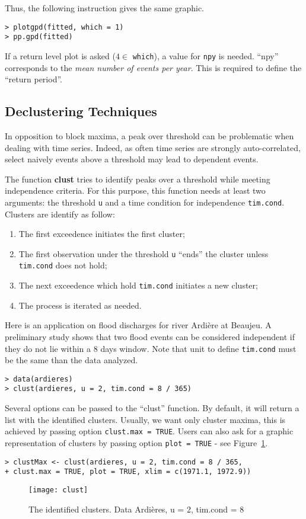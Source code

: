 \documentclass[11pt,a4paper]{article}
\numberwithin{equation}{section}
\begin{document}
Thus, the following instruction gives the same graphic.
\begin{verbatim}
> plotgpd(fitted, which = 1)
> pp.gpd(fitted)
\end{verbatim}

If a return level plot is asked ($4 \in$ \verb|which|), a value for
\verb|npy| is needed. ``npy'' corresponds to the \emph{mean number of
  events per year}. This is required to define the ``return period''.

\subsection{Declustering Techniques}
\label{subsec:declust}

In opposition to block maxima, a peak over threshold can be
problematic when dealing with time series. Indeed, as often time
series are strongly auto-correlated, select naively events above a
threshold may lead to dependent events.

The function \textbf{clust} tries to identify peaks over a threshold
while meeting independence criteria. For this purpose, this function
needs at least two arguments: the threshold \verb|u| and a time
condition for independence \verb|tim.cond|. Clusters are identify as
follow:
\begin{enumerate}
\item The first exceedence initiates the first cluster;
\item The first observation under the threshold \verb|u| ``ends'' the
  cluster unless \verb|tim.cond| does not hold;
\item The next exceedence which hold \verb|tim.cond| initiates a new
  cluster;
\item The process is iterated as needed.
\end{enumerate}

Here is an application on flood discharges for river Ardi\`ere at
Beaujeu. A preliminary study shows that two flood events can be
considered independent if they do not lie within a 8 days window. Note
that unit to define \verb|tim.cond| must be the same than the data
analyzed. 
\begin{verbatim}
> data(ardieres)
> clust(ardieres, u = 2, tim.cond = 8 / 365)
\end{verbatim}

Several options can be passed to the ``clust'' function. By default,
it will return a list with the identified clusters. Usually, we want
only cluster maxima, this is achieved by passing option
\verb|clust.max = TRUE|. Users can also ask for a graphic
representation of clusters by passing option \verb|plot = TRUE| - see
Figure~\ref{fig:clust}.
\begin{verbatim}
> clustMax <- clust(ardieres, u = 2, tim.cond = 8 / 365,
+ clust.max = TRUE, plot = TRUE, xlim = c(1971.1, 1972.9))
\end{verbatim}
\begin{figure}
  \centering
  \texttt{[image: clust]}
  \caption{The identified clusters. Data Ardi\`eres, u = 2, tim.cond = 8}
  \label{fig:clust}
\end{figure}
\end{document}
